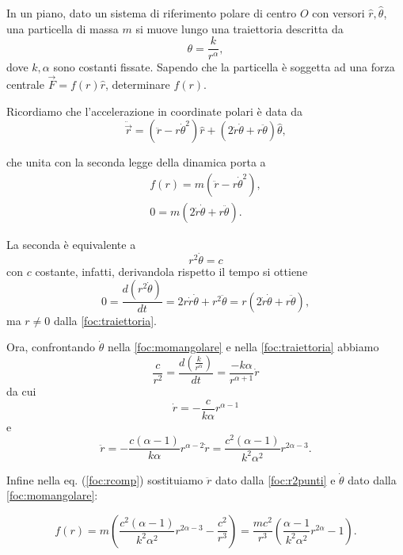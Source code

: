 \documentclass[../main.tex]{subfiles}
\begin{document}

\textex
In un piano, dato un sistema di riferimento polare di centro $O$ con versori $\hat{r},\hat{\theta}$, una particella di massa $m$ si muove lungo una traiettoria descritta da
\begin{equation}
	\label{foc:traiettoria}
	\theta=\frac{k}{r^\alpha},
\end{equation}
dove $k, \alpha$ sono costanti fissate. Sapendo che la particella \`e soggetta ad una forza centrale $\vec{F}=f(r)\hat{r}$, determinare $f(r)$.

\solution

Ricordiamo che l'accelerazione in coordinate polari \`e data da
\[
	\ddot{\vec{r}}=(\ddot{r}-r\dot{\theta}^2)\hat{r}+(2\dot{r}\dot{\theta}+r\ddot{\theta})\hat{\theta},
\]

che unita con la seconda legge della dinamica porta a
\begin{eqnarray}
	&f(r)=m(\ddot{r}-r\dot{\theta}^2),&	
	\label{foc:rcomp}\\
	&0=m(2\dot{r}\dot{\theta}+r\ddot{\theta}).&
\end{eqnarray}

La seconda \`e equivalente a
\begin{equation}
	\label{foc:momangolare}	
	r^2\dot{\theta}=c
\end{equation}
con $c$ costante, infatti, derivandola  rispetto il tempo si ottiene
\[
	0=\frac{d(r^2\dot{\theta})}{dt}=2r\dot{r}\dot{\theta}+r^2\ddot{\theta}=r(2\dot{r}\dot{\theta}+r\ddot{\theta}),
\]
ma $r\neq 0$ dalla \cref{foc:traiettoria}.

Ora, confrontando $\dot{\theta}$ nella \cref{foc:momangolare} e nella \cref{foc:traiettoria}	abbiamo
\[
	\frac{c}{r^2}=\frac{d\left(\frac{k}{r^{\alpha}}\right)}{dt}=\frac{-k\alpha}{r^{\alpha+1}}\dot{r}
\]
da cui
\[
	\dot{r}=-\frac{c}{k\alpha}r^{\alpha-1}
\]
e
\begin{equation}
	\label{foc:r2punti}
	\ddot{r}=-\frac{c(\alpha-1)}{k\alpha}r^{\alpha-2}\dot{r}=\frac{c^2(\alpha-1)}{k^2\alpha^2}r^{2\alpha-3}.
\end{equation}

Infine nella eq. (\ref{foc:rcomp}) sostituiamo $\ddot{r}$ dato dalla \cref{foc:r2punti} e $\dot{\theta}$ dato dalla \cref{foc:momangolare}:

\[
	f(r)=m\left(\frac{c^2(\alpha-1)}{k^2\alpha^2}r^{2\alpha-3}-\frac{c^2}{r^3}\right)
	=\frac{mc^2}{r^3}\left(\frac{\alpha-1}{k^2\alpha^2}r^{2\alpha}-1\right).
\]
\end{document}
